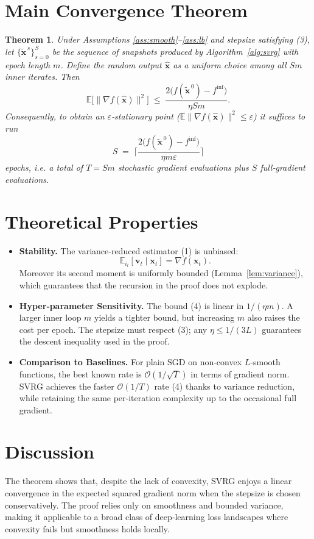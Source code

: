 \documentclass{article}
\newtheorem{theorem}{Theorem}
\newcommand{\EE}{\mathbb{E}}
\begin{document}
\section*{Main Convergence Theorem}
\begin{theorem}\label{thm:main}
Under Assumptions \ref{ass:smooth}–\ref{ass:lb} and stepsize satisfying (3), let $\{\tilde{\mathbf{x}}^{\,s}\}_{s=0}^{S}$ be the sequence of snapshots produced by Algorithm~\ref{alg:svrg} with epoch length $m$. Define the random output $\hat{\mathbf{x}}$ as a uniform choice among all $Sm$ inner iterates. Then
\[
\EE\bigl[\|\nabla f(\hat{\mathbf{x}})\|^{2}\bigr]\;\le\;
\frac{2\bigl(f(\tilde{\mathbf{x}}^{\,0})-f^{\inf}\bigr)}{\eta Sm}.
\tag{4}
\]
Consequently, to obtain an $\varepsilon$‑stationary point ($\EE\|\nabla f(\hat{\mathbf{x}})\|^{2}\le\varepsilon$) it suffices to run
\[
S\;=\;\Big\lceil\frac{2\bigl(f(\tilde{\mathbf{x}}^{\,0})-f^{\inf}\bigr)}{\eta m\varepsilon}\Big\rceil
\]
epochs, i.e. a total of $T=Sm$ stochastic gradient evaluations plus $S$ full‑gradient evaluations.
\end{theorem}

\section*{Theoretical Properties}
\begin{itemize}
\item \textbf{Stability.} The variance‑reduced estimator (1) is unbiased:
\[
\EE_{i_t}[\mathbf{v}_t\mid\mathbf{x}_t]=\nabla f(\mathbf{x}_t).
\]
Moreover its second moment is uniformly bounded (Lemma~\ref{lem:variance}), which guarantees that the recursion in the proof does not explode.
\item \textbf{Hyper‑parameter Sensitivity.} The bound (4) is linear in $1/(\eta m)$. A larger inner loop $m$ yields a tighter bound, but increasing $m$ also raises the cost per epoch. The stepsize must respect (3); any $\eta\le 1/(3L)$ guarantees the descent inequality used in the proof.
\item \textbf{Comparison to Baselines.} For plain SGD on non‑convex $L$‑smooth functions, the best known rate is $\mathcal{O}(1/\sqrt{T})$ in terms of gradient norm. SVRG achieves the faster $\mathcal{O}(1/T)$ rate (4) thanks to variance reduction, while retaining the same per‑iteration complexity up to the occasional full gradient.
\end{itemize}

\section*{Discussion}
The theorem shows that, despite the lack of convexity, SVRG enjoys a linear convergence in the expected squared gradient norm when the stepsize is chosen conservatively. The proof relies only on smoothness and bounded variance, making it applicable to a broad class of deep‑learning loss landscapes where convexity fails but smoothness holds locally.
\end{document}
